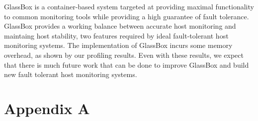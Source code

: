 \documentclass{proc}
\begin{document}
GlassBox is a container-based system targeted at providing maximal functionality to common monitoring tools while providing a high guarantee of fault tolerance. GlassBox provides a working balance between accurate host monitoring and maintaing host stability, two features required by ideal fault-tolerant host monitoring systems. The implementation of GlassBox incurs some memory overhead, as shown by our profiling results. Even with these results, we expect that there is much future work that can be done to improve GlassBox and build new fault tolerant host monitoring systems.




\clearpage

\section*{Appendix A}

\clearpage
\end{document}
